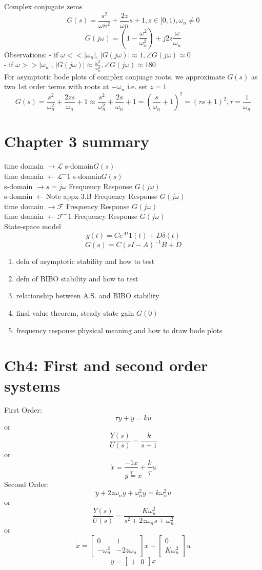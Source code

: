 \documentclass[letterpaper]{article}
\begin{document}
Complex conjugate zeros
$$G(s)=\frac{s^2}{\omega n^2}+\frac{2z}{\omega n}s + 1, z\in [0,1),\omega_n \not = 0$$
	$$G(j\omega)=(1-\frac{\omega^2}{\omega_n^2})+j2z\frac{\omega}{\omega_n}$$
	Observations:
	- if $\omega << |\omega_n|$, $|G(j\omega)| \approx 1, \angle G(j\omega)\approx 0$\\
	- if $\omega >> |\omega_n|$, $|G(j\omega)|\approx \frac{\omega^2}{\omega_n^2},\angle G(j\omega) \approx 180$\\
	For asymptotic bode plots of complex conjuage roots, we approximate $G(s)$
	as two 1st order terms with roots at $-\omega_n$ i.e. set $z=1$
	$$G(s)=\frac{s^2}{\omega_n^2}+\frac{2zs}{\omega_n}+1\approx \frac{s^2}{\omega_n^2}+\frac{2s}{\omega_n}+1=(\frac{s}{\omega_n}+1)^2=(\tau s+1)^2, \tau=\frac{1}{\omega_n}$$
	\section*{Chapter 3 summary}
	time domain $\rightarrow \mathscr{L}$ s-domain$G(s)$\\
	time domain $\leftarrow \mathscr{L}^-1$ s-domain$G(s)$\\
	s-domain $\rightarrow s=j\omega$ Frequency Response $G(j\omega)$\\
	s-domain $\leftarrow $Note appx 3.B Frequency Response $G(j\omega)$\\
	time domain $\rightarrow \mathscr{F}$  Frequency Response $G(j\omega)$\\
	time domain $\leftarrow \mathscr{F}^-1$  Frequency Response $G(j\omega)$\\
	State-space model
	$$g(t)=Ce^{At}1(t)+D\delta(t)$$
	$$G(s)=C(sI-A)^{-1}B+D$$
	\begin{enumerate}
		\item defn of asymptotic stability and how to test
		\item defn of BIBO stability and how to test
		\item relationship between A.S. and BIBO stability
		\item final value theorem, steady-state gain $G(0)$
		\item frequency response physical meaning and how to draw bode plots
	\end{enumerate}
		
	\section*{Ch4: First and second order systems}
	First Order:
	$$\tau \dot y+y=ku$$
	or $$\frac{Y(s)}{U(s)}=\frac{k}{s+1}$$
	or $$\dot x=\frac{-1x}{\tau}+\frac{k}{\tau}u$$
	$$y=x$$
	Second Order:
	$$\ddot y+2z\omega_n\dot y+\omega_n^2y=k\omega_n^2u$$
	or $$\frac{Y(s)}{U(s)}=\frac{K\omega_n^2}{s^2+2z\omega_ns+\omega_n^2}$$
	or $$\dot x = \begin{bmatrix} 0&1\\-\omega_n^2&-2z\omega_n\end{bmatrix}x+\begin{bmatrix} 0\\K\omega_n^2\end{bmatrix}u$$
	$$y=\begin{bmatrix}1&0\end{bmatrix}x$$
\end{document}
